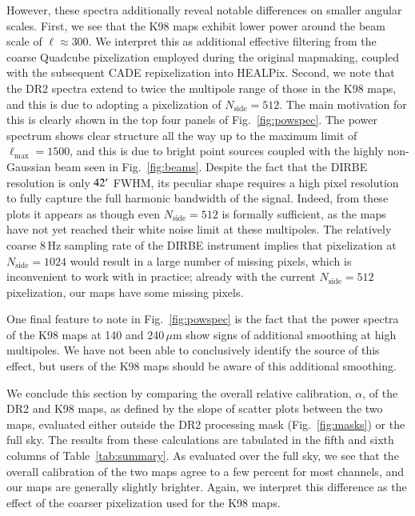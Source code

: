 \documentclass{aa}
\begin{document}
However, these spectra additionally reveal notable differences on
smaller angular scales. First, we see that the K98 maps exhibit lower
power around the beam scale of $\ell\approx300$. We interpret this as
additional effective filtering from the coarse Quadcube
pixelization employed during the original mapmaking, coupled with the
subsequent CADE repixelization into HEALPix. Second, we note that the
DR2 spectra extend to twice the multipole range of those in the K98 maps, and
this is due to adopting a pixelization of $N_{\mathrm{side}}=512$. The
main motivation for this is clearly shown in the top four panels of
Fig.~\ref{fig:powspec}. The power spectrum shows clear structure all
the way up to the maximum limit of $\ell_{\mathrm{max}}=1500$, and
this is due to bright point sources coupled with the highly
non-Gaussian beam seen in Fig.~\ref{fig:beams}. Despite the fact that
the DIRBE resolution is only $42\arcm$ FWHM, its peculiar shape
requires a high pixel resolution to fully capture the full harmonic
bandwidth of the signal. Indeed, from these plots it appears as though
even $N_{\mathrm{side}}=512$ is formally sufficient, as the maps have
not yet reached their white noise limit at these
multipoles. The relatively coarse 8\,Hz sampling rate
of the DIRBE instrument implies that pixelization at
$N_{\mathrm{side}}=1024$ would result in a large number of missing
pixels, which is inconvenient to work with in practice; already with
the current $N_{\mathrm{side}}=512$ pixelization, our maps have some
missing pixels.

One final feature to note in Fig.~\ref{fig:powspec} is the fact that
the power spectra of the K98 maps at 140 and 240$\,\mu$m show signs of
additional smoothing at high multipoles. We have not been able to
conclusively identify the source of this effect, but users of the K98
maps should be aware of this additional smoothing.

We conclude this section by comparing the overall relative
calibration, $\alpha$, of the DR2 and K98 maps, as defined by the
slope of scatter plots between the two maps, evaluated either
outside the DR2 processing mask (Fig.~\ref{fig:masks}) or the full sky. The results from
these calculations are tabulated in the fifth and sixth columns of
Table~\ref{tab:summary}. As evaluated over the full sky, we see that
the overall calibration of the two maps agree to a few percent for
most channels, and our maps are generally slightly brighter. Again, we
interpret this difference as the effect of the coarser pixelization
used for the K98 maps. 
\end{document}
